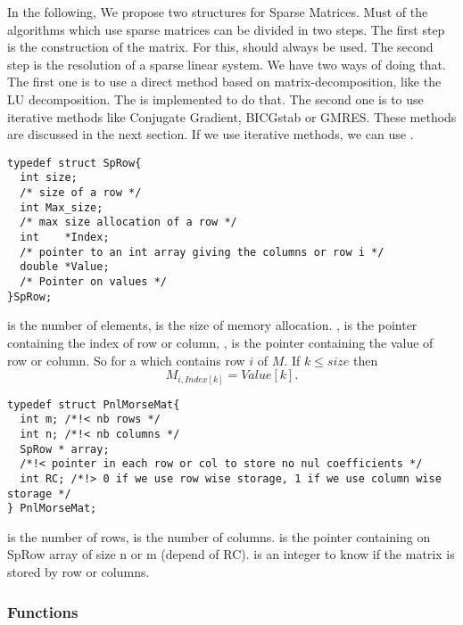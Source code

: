 In the following, We propose two structures for Sparse Matrices.  Must of the
algorithms which use sparse matrices can be divided in two steps.  The first
step is the construction of the matrix. For this,  should
always be used. The second step is the resolution of a sparse linear system. We
have two ways of doing that. The first one is to use a direct method based on
matrix-decomposition, like the LU decomposition. The  is
implemented to do that. The second one is to use iterative methods like
Conjugate Gradient, BICGstab or GMRES. These methods are discussed in the next
section. If we use iterative methods, we can use . 

\begin{verbatim}
typedef struct SpRow{
  int size;
  /* size of a row */
  int Max_size;
  /* max size allocation of a row */
  int    *Index;
  /* pointer to an int array giving the columns or row i */
  double *Value;
  /* Pointer on values */
}SpRow;
\end{verbatim}
 is the number of elements, 
 is the size of memory allocation.
, is the pointer containing the index of row or column, 
, is the pointer containing the value of row or column.
So for a  which contains row $i$ of $M$.
If $k \leq size $ then
$$M_{i, Index[k]}=Value[k].$$  

\begin{verbatim}
typedef struct PnlMorseMat{
  int m; /*!< nb rows */ 
  int n; /*!< nb columns */ 
  SpRow * array; 
  /*!< pointer in each row or col to store no nul coefficients */
  int RC; /*!> 0 if we use row wise storage, 1 if we use column wise storage */ 
} PnlMorseMat;
\end{verbatim}
 is the number of rows,  is the number of columns.
 is the pointer containing on SpRow array of size n or m (depend of
RC).
 is an integer to know if the matrix is stored by row or columns.

\subsubsection{Functions}
